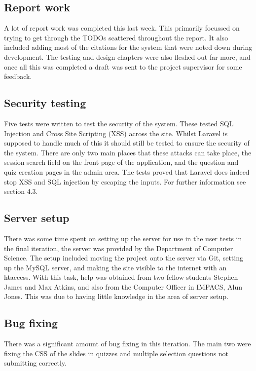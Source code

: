 \subsection{Report work}
A lot of report work was completed this last week. This primarily focussed on trying to get through the TODOs scattered throughout the report. It also included adding most of the citations for the system that were noted down during development. The testing and design chapters were also fleshed out far more, and once all this was completed a draft was sent to the project supervisor for some feedback.

\subsection{Security testing}
Five tests were written to test the security of the system. These tested SQL Injection and Cross Site Scripting (XSS) across the site. Whilst Laravel is supposed to handle much of this it should still be tested to ensure the security of the system. There are only two main places that these attacks can take place, the session search field on the front page of the application, and the question and quiz creation pages in the admin area. The tests proved that Laravel does indeed stop XSS and SQL injection by escaping the inputs. For further information see section 4.3.

\subsection{Server setup}
There was some time spent on setting up the server for use in the user tests in the final iteration, the server was provided by the Department of Computer Science. The setup included moving the project onto the server via Git, setting up the MySQL server, and making the site visible to the internet with an htaccess. With this task, help was obtained from two fellow students Stephen James and Max Atkins, and also from the Computer Officer in IMPACS, Alun Jones. This was due to having little knowledge in the area of server setup.

\subsection{Bug fixing}
There was a significant amount of bug fixing in this iteration. The main two were fixing the CSS of the slides in quizzes and multiple selection questions not submitting correctly. 

